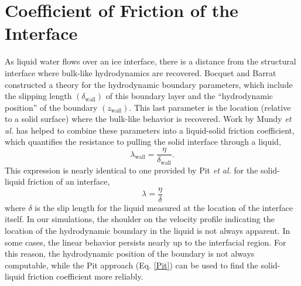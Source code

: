



\section{Coefficient of Friction of the Interface}
As liquid water flows over an ice interface, there is a distance from
the structural interface where bulk-like hydrodynamics are recovered.
Bocquet and Barrat constructed a theory for the hydrodynamic boundary
parameters, which include the slipping length
$\left(\delta_\mathrm{wall}\right)$ of this boundary layer and the
``hydrodynamic position'' of the boundary
$\left(z_\mathrm{wall}\right)$.\cite{PhysRevLett.70.2726,PhysRevE.49.3079}
This last parameter is the location (relative to a solid surface)
where the bulk-like behavior is recovered.  Work by Mundy {\it et al.}
has helped to combine these parameters into a liquid-solid friction
coefficient, which quantifies the resistance to pulling the solid
interface through a liquid,\cite{Mundy1997305}
\begin{equation}
\lambda_\mathrm{wall} = \frac{\eta}{\delta_\mathrm{wall}}.
\end{equation}
This expression is nearly identical to one provided by Pit {\it et
  al.} for the solid-liquid friction of an interface,\cite{Pit1999}
\begin{equation}\label{Pit}
  \lambda=\frac{\eta}{\delta}
\end{equation}
where $\delta$ is the slip length for the liquid measured at the
location of the interface itself.  In our simulations, the shoulder on
the velocity profile indicating the location of the hydrodynamic
boundary in the liquid is not always apparent. In some cases, the
linear behavior persists nearly up to the interfacial region.  For
this reason, the hydrodynamic position of the boundary is not always
computable, while the Pit approach (Eq. \ref{Pit}) can be used to find
the solid-liquid friction coefficient more reliably.

